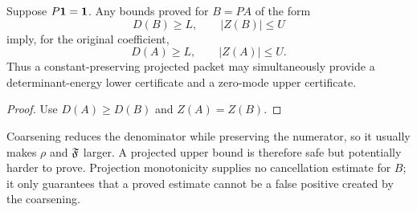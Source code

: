 \begin{proposition}
\label{prop:safe-dominance-ledger}
Suppose \(P\mathbf 1=\mathbf 1\).  Any bounds proved for \(B=PA\) of the form
\[
 D(B)\ge L,\qquad |Z(B)|\le U
\]
imply, for the original coefficient,
\[
 D(A)\ge L,\qquad |Z(A)|\le U.
\]
Thus a constant-preserving projected packet may simultaneously
provide a determinant-energy lower certificate and a zero-mode
upper certificate.
\end{proposition}

\begin{proof}
Use \(D(A)\ge D(B)\) and \(Z(A)=Z(B)\).
\end{proof}

\begin{remark}
\label{rem:conservative-not-easy}
Coarsening reduces the denominator while preserving the numerator,
so it usually makes \(\rho\) and \(\mathfrak F\) larger.  A projected
upper bound is therefore safe but potentially harder to prove.
Projection monotonicity supplies no cancellation estimate for
\(B\); it only guarantees that a proved estimate cannot be a
false positive created by the coarsening.
\end{remark}
